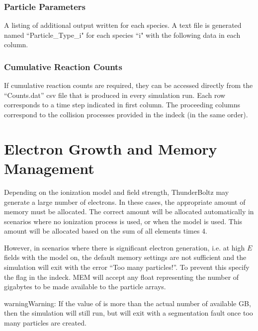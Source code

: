 \documentclass[letterpaper,10pt,english,openany,oneside]{sphinxmanual}
\begin{document}


\subsection{Particle Parameters}
A listing of additional output written for each species. A text
file is generated named ``Particle\_Type\_i" for each species ``i"
with the following data in each column.



\subsection{Cumulative Reaction Counts}
If cumulative reaction counts are required, they can be accessed directly from
the ``Counts.dat'' csv file that is produced in every simulation run. Each row corresponds
to a time step indicated in first column. The proceeding columns
correspond to the collision processes provided in the indeck (in the same order).

\chapter{Electron Growth and Memory Management}
\label{\detokenize{short_index:electron-growth-and-memory-management}}\label{\detokenize{short_index:memory}}
\sphinxAtStartPar
Depending on the ionization model and field strength,
ThunderBoltz may generate a large number of electrons.
In these cases, the appropriate amount of memory must be
allocated. The correct amount will be allocated automatically
in scenarios where no ionization process is used,
or when the  model is used. This amount
will be allocated based on the sum of all  elements
times 4.

\sphinxAtStartPar
However, in scenarios where there is significant electron generation,
i.e. at high \(E\) fields with the  model on,
the default memory settings are not sufficient and the simulation
will exit with the error “Too many particles!”. To prevent this
specify the  flag in the indeck. MEM will accept any
float representing the number of gigabytes to be made available
to the particle arrays.

\begin{sphinxadmonition}{warning}{Warning:}
\sphinxAtStartPar
If the value of  is more than the actual number of
available GB, then the simulation will still run, but will
exit with a segmentation fault once too many particles are
created.
\end{sphinxadmonition}
\end{document}
